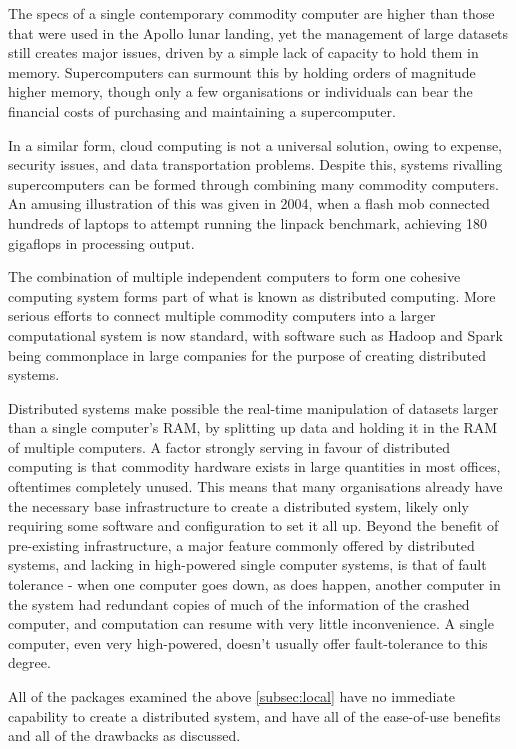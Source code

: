 
The specs of a single contemporary commodity computer are higher than
those that were used in the Apollo lunar landing, yet the management of
large datasets still creates major issues, driven by a simple lack of
capacity to hold them in memory. Supercomputers can surmount this by
holding orders of magnitude higher memory, though only a few
organisations or individuals can bear the financial costs of purchasing
and maintaining a supercomputer.

In a similar form, cloud computing is not a universal solution, owing to
expense, security issues, and data transportation problems. Despite
this, systems rivalling supercomputers can be formed through combining
many commodity computers. An amusing illustration of this was given in
2004, when a flash mob connected hundreds of laptops to attempt running
the linpack benchmark, achieving 180 gigaflops in processing
output\cite{perry2004flashcomp}.

The combination of multiple independent computers to form one cohesive
computing system forms part of what is known as distributed computing.
More serious efforts to connect multiple commodity computers into a
larger computational system is now standard, with software such as
Hadoop and Spark being commonplace in large companies for the purpose of
creating distributed systems.

Distributed systems make possible the real-time manipulation of datasets
larger than a single computer's RAM, by splitting up data and holding it
in the RAM of multiple computers. A factor strongly serving in favour of
distributed computing is that commodity hardware exists in large
quantities in most offices, oftentimes completely unused. This means
that many organisations already have the necessary base infrastructure
to create a distributed system, likely only requiring some software and
configuration to set it all up. Beyond the benefit of pre-existing
infrastructure, a major feature commonly offered by distributed systems,
and lacking in high-powered single computer systems, is that of fault
tolerance - when one computer goes down, as does happen, another
computer in the system had redundant copies of much of the information
of the crashed computer, and computation can resume with very little
inconvenience. A single computer, even very high-powered, doesn't
usually offer fault-tolerance to this degree.

All of the packages examined the above \cref{subsec:local} have no
immediate capability to create a distributed system, and have all of the
ease-of-use benefits and all of the drawbacks as discussed.


